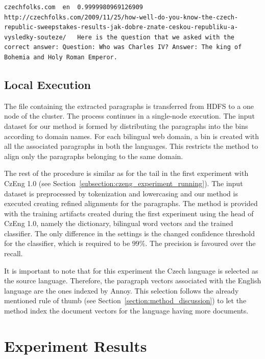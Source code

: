 \begin{lstlisting}[float=!htb,caption={sample from a file with extracted paragraphs (English)},label={listing:experiment_paragraphs_en},firstnumber=3185639]
czechfolks.com	en	0.9999980969126909	http://czechfolks.com/2009/11/25/how-well-do-you-know-the-czech-republic-sweepstakes-results-jak-dobre-znate-ceskou-republiku-a-vysledky-souteze/	Here is the question that we asked with the correct answer: Question: Who was Charles IV? Answer: The king of Bohemia and Holy Roman Emperor.
\end{lstlisting}

\subsection{Local Execution}
\label{subsection:common_crawl_local_execution}

The file containing the extracted paragraphs is transferred from HDFS to a one node of the cluster. The process continues in a single-node execution. The input dataset for our method is formed by distributing the paragraphs into the bins according to domain names. For each bilingual web domain, a bin is created with all the associated paragraphs in both the languages. This restricts the method to align only the paragraphs belonging to the same domain.

The rest of the procedure is similar as for the tail in the first experiment with CzEng 1.0 (see Section~\ref{subsection:czeng_experiment_running}). The input dataset is preprocessed by tokenization and lowercasing and our method is executed creating refined alignments for the paragraphs. The method is provided with the training artifacts created during the first experiment using the head of CzEng 1.0, namely the dictionary, bilingual word vectors and the trained classifier. The only difference in the settings is the changed confidence threshold for the classifier, which is required to be $99\%$. The precision is favoured over the recall. 

It is important to note that for this experiment the Czech language is selected as the source language. Therefore, the paragraph vectors associated with the English language are the ones indexed by Annoy. This selection follows the already mentioned rule of thumb (see Section~\ref{section:method_discussion}) to let the method index the document vectors for the language having more documents.

\section{Experiment Results}
\label{section:common_crawl_experiment_results}

